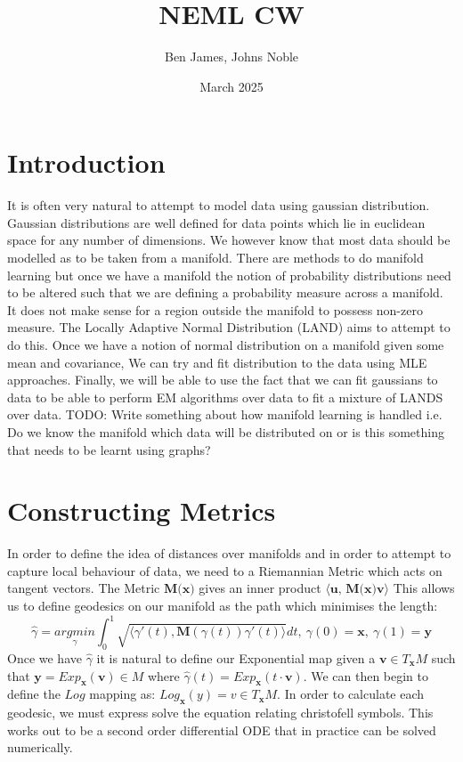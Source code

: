 \documentclass{article}
\title{NEML CW}
\author{Ben James, Johns Noble}
\date{March 2025}
\begin{document}
\maketitle
\tableofcontents
\section{Introduction}
It is often very natural to attempt to model data using gaussian distribution. 
Gaussian distributions are well defined for data points which lie in euclidean space for any number of dimensions.
We however know that most data should be modelled as to be taken from a manifold.
There are methods to do manifold learning but once we have a manifold the notion of probability distributions need to be altered such that we are defining a probability measure across a manifold.
It does not make sense for a region outside the manifold to possess non-zero measure.
The Locally Adaptive Normal Distribution (LAND) aims to attempt to do this.
Once we have a notion of normal distribution on a manifold given some mean and covariance, We can try and fit distribution to the data using MLE approaches.
Finally, we will be able to use the fact that we can fit gaussians to data to be able to perform EM algorithms over data to fit a mixture of LANDS over data.
TODO: Write something about how manifold learning is handled i.e. Do we know the manifold which data will be distributed on or is this something that needs to be learnt using graphs?

\section{Constructing Metrics}
In order to define the idea of distances over manifolds and in order to attempt to capture local behaviour of data, we need to a Riemannian Metric which acts on tangent vectors.
The Metric $\textbf{M(x)}$ gives an inner product $\langle \textbf{u, M(x)v}\rangle$
This allows us to define geodesics on our manifold as the path which minimises the length:
$$\hat{\gamma} = \underset{\gamma}{argmin} \int_0^1\sqrt{\langle \gamma'(t),\textbf{M}(\gamma(t))
\gamma'(t)\rangle}dt,\: \gamma(0)=\textbf{x},\:\gamma(1)=\textbf{y}$$
Once we have $\hat{\gamma}$ it is natural to define our Exponential map given a $\textbf{v}\in T_\textbf{x}M$ such that $\textbf{y} =Exp_\textbf{x}(\textbf{v}) \in M$ where $\hat{\gamma}(t) = Exp_\textbf{x}(t\cdot\textbf{v})$.
We can then begin to define the $Log$ mapping as: $Log_\textbf{x}(y)=v\in T_\textbf{x}M$.
In order to calculate each geodesic, we must express solve the equation relating christofell symbols.
This works out to be a second order differential ODE that in practice can be solved numerically.
\end{document}
